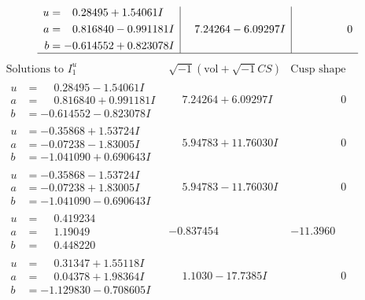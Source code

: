 \documentclass[1p]{elsarticle_modified}
\theoremstyle{definition}
\newcommand{\I}{\sqrt{-1}}
\begin{document}
$$\begin{array}{c|c|c}
\begin{aligned}
u &= \phantom{-}0.28495 + 1.54061 I \\
a &= \phantom{-}0.816840 - 0.991181 I \\
b &= -0.614552 + 0.823078 I\end{aligned}
 & \phantom{-}7.24264 - 6.09297 I & \phantom{-0.000000 } 0\\
 \hline 
 \end{array}$$\newpage$$\begin{array}{c|c|c}  
\text{Solutions to }I^u_{1}& \I (\text{vol} + \sqrt{-1}CS) & \text{Cusp shape}\\
 \hline 
\begin{aligned}
u &= \phantom{-}0.28495 - 1.54061 I \\
a &= \phantom{-}0.816840 + 0.991181 I \\
b &= -0.614552 - 0.823078 I\end{aligned}
 & \phantom{-}7.24264 + 6.09297 I & \phantom{-0.000000 } 0 \\ \hline\begin{aligned}
u &= -0.35868 + 1.53724 I \\
a &= -0.07238 - 1.83005 I \\
b &= -1.041090 + 0.690643 I\end{aligned}
 & \phantom{-}5.94783 + 11.76030 I & \phantom{-0.000000 } 0 \\ \hline\begin{aligned}
u &= -0.35868 - 1.53724 I \\
a &= -0.07238 + 1.83005 I \\
b &= -1.041090 - 0.690643 I\end{aligned}
 & \phantom{-}5.94783 - 11.76030 I & \phantom{-0.000000 } 0 \\ \hline\begin{aligned}
u &= \phantom{-}0.419234\phantom{ +0.000000I} \\
a &= \phantom{-}1.19049\phantom{ +0.000000I} \\
b &= \phantom{-}0.448220\phantom{ +0.000000I}\end{aligned}
 & -0.837454\phantom{ +0.000000I} & -11.3960\phantom{ +0.000000I} \\ \hline\begin{aligned}
u &= \phantom{-}0.31347 + 1.55118 I \\
a &= \phantom{-}0.04378 + 1.98364 I \\
b &= -1.129830 - 0.708605 I\end{aligned}
 & \phantom{-}1.1030 - 17.7385 I & \phantom{-0.000000 } 0 \\ \hline\begin{aligned}

\end{aligned}
\end{array}$$
\end{document}
